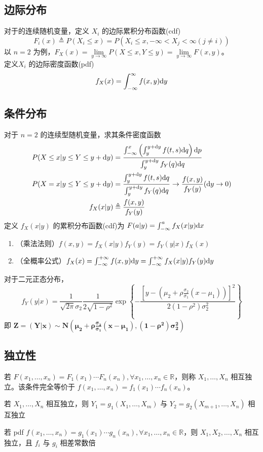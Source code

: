 \documentclass[./main.tex]{subfiles}
\begin{document}
\subsection{边际分布}
对于的连续随机变量，定义 $X_i$ 的边际累积分布函数(cdf)
\begin{equation}
    F_i(x)\triangleq P(X_i\le x)=P(X_i\le x,-\infty<X_j<\infty(j\neq i))
\end{equation}
以 $n=2$ 为例，$F_X(x)=\lim\limits_{y\rightarrow\infty}P(X\le x,Y\le y)=\lim\limits_{y\rightarrow\infty}F(x,y)$。\\
定义$X_i$ 的边际密度函数(pdf)
 $$f_X(x)=\int_{-\infty}^{\infty}f(x,y)\text{d}y$$
\subsection{条件分布}
对于 $n=2$ 的连续型随机变量，求其条件密度函数
\begin{align}
    P(X\le x|y\le Y\le y+\text{d}y)&=\frac{\int_{-\infty}^x\left(\int_y^{y+\text{d}y}f(t,s)\text{d}q\right)\text{d}p}{\int_{y}^{y+\text{d}y}f_Y(q)\text{d}q}\notag\\
    P(X=x|y\le Y\le y+\text{d}y)&=\frac{\int_y^{y+\text{d}y}f(t,s)\text{d}q}{\int_{y}^{y+\text{d}y}f_Y(q)\text{d}q}\notag\rightarrow\frac{f(x,y)}{f_Y(y)}\notag(\text{d}y\rightarrow 0)\\
    f_X(x|y)&\triangleq\frac{f(x,y)}{f_Y(y)}
\end{align}
定义 $f_X(x|y)$ 的累积分布函数(cdf)为 $F(a|y)=\int_{-\infty}^a f_X(x|y)\text{d}x$
\begin{enumerate}[(1)]
    \item （乘法法则）$f(x,y)=f_X(x|y)f_Y(y)=f_Y(y|x)f_X(x)$
    \item （全概率公式）$f_X(x)=\int_{-\infty}^{+\infty}f(x,y)\text{d}y=\int_{-\infty}^{+\infty}f_X(x|y)f_Y(y)\text{d}y$
\end{enumerate}
对于二元正态分布，
\begin{equation}
    f_Y(y|x)=\frac{1}{\sqrt{2\pi}\sigma_2}\frac{1}{2\sqrt{1-\rho^2}}\exp\left\{-\frac{[y-(\mu_2+\rho\frac{\sigma_2}{\sigma_1}(x-\mu_1))]^2}{2(1-\rho^2)\sigma_2^2}\right\}
\end{equation}
即 $\bm{Z=(Y|x)\sim N(\mu_2+\rho\frac{\sigma_2}{\sigma_1}(x-\mu_1),(1-\rho^2)\sigma_2^2)}$
\subsection{独立性}
若 $F(x_1,\dots,x_n)=F_1(x_1)\cdots F_n(x_n),\forall x_1,\dots,x_n\in\mathbb{R}$，则称 $X_1,\dots,X_n$ 相互独立。该条件完全等价于 $f(x_1,\dots,x_n)=f_1(x_1)\cdots f_n(x_n)$。
\begin{enumerate*}
    \item 若 $X_1,\dots,X_n$ 相互独立，则 $Y_1=g_1(X_1,\dots,X_m)$ 与 $Y_2=g_2(X_{m+1},\dots,X_n)$ 相互独立
    \item 若 pdf $f(x_1,\dots,x_n)=g_1(x_1)\cdots g_n(x_n),\forall x_1,\dots,x_n\in\mathbb{R}$，则 $X_1,X_2,\dots,X_n$ 相互独立，且 $f_i$ 与 $g_i$ 相差常数倍 
\end{enumerate*}
\end{document}
